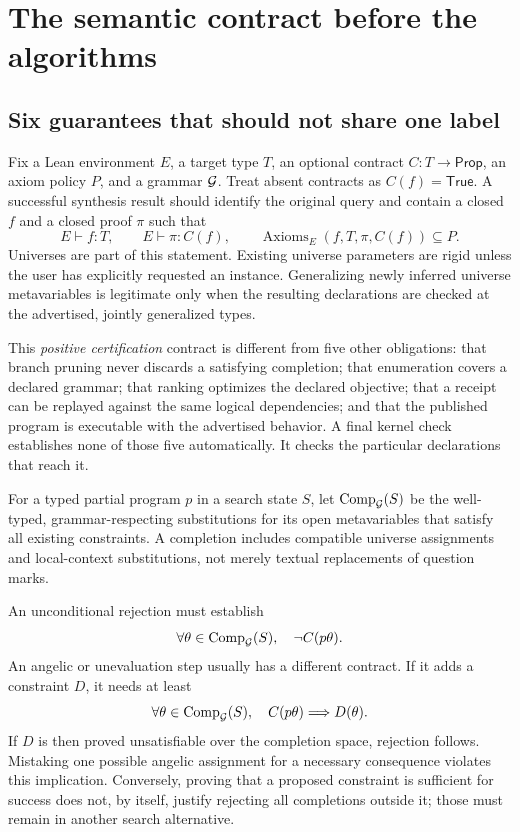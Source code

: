 \section{The semantic contract before the algorithms}\label{sec:foundation}

\subsection{Six guarantees that should not share one label}

Fix a Lean environment $E$, a target type $T$, an optional contract $C:T\to\mathsf{Prop}$, an axiom policy $P$, and a grammar $\mathcal G$. Treat absent contracts as $C(f)=\mathsf{True}$. A successful synthesis result should identify the original query and contain a closed $f$ and a closed proof $\pi$ such that
\[
 E\vdash f:T,\qquad E\vdash\pi:C(f),\qquad
 \operatorname{Axioms}_E(f,T,\pi,C(f))\subseteq P.
\]
Universes are part of this statement. Existing universe parameters are rigid unless the user has explicitly requested an instance. Generalizing newly inferred universe metavariables is legitimate only when the resulting declarations are checked at the advertised, jointly generalized types.

This \emph{positive certification} contract is different from five other obligations: that branch pruning never discards a satisfying completion; that enumeration covers a declared grammar; that ranking optimizes the declared objective; that a receipt can be replayed against the same logical dependencies; and that the published program is executable with the advertised behavior. A final kernel check establishes none of those five automatically. It checks the particular declarations that reach it.\cite{leanmanual,implementation}

\begin{definition}
For a typed partial program $p$ in a search state $S$, let $\operatorname{Comp}_{\mathcal G}(S)$ be the well-typed, grammar-respecting substitutions for its open metavariables that satisfy all existing constraints. A completion includes compatible universe assignments and local-context substitutions, not merely textual replacements of question marks.
\end{definition}

An unconditional rejection must establish
\begin{equation}\label{eq:stable-prune}
 \forall\theta\in\operatorname{Comp}_{\mathcal G}(S),\quad \neg C(p\theta).
\end{equation}
An angelic or unevaluation step usually has a different contract. If it adds a constraint $D$, it needs at least
\begin{equation}\label{eq:necessary-constraint}
 \forall\theta\in\operatorname{Comp}_{\mathcal G}(S),\quad C(p\theta)\Longrightarrow D(\theta).
\end{equation}
If $D$ is then proved unsatisfiable over the completion space, rejection follows. Mistaking one possible angelic assignment for a necessary consequence violates this implication. Conversely, proving that a proposed constraint is sufficient for success does not, by itself, justify rejecting all completions outside it; those must remain in another search alternative.

